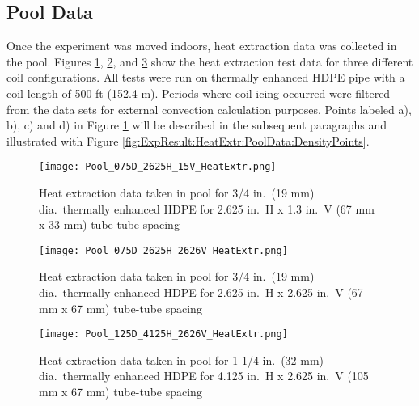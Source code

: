 	\subsection{Pool Data}
	\label{subsec:ExpResult:HeatExtr:PoolData}
	
Once the experiment was moved indoors, heat extraction data was collected in the pool. Figures \ref{fig:ExpResult:HeatExtr:PoolData:Pool_075D_2625H_15V_HeatExtr}, \ref{fig:ExpResult:HeatExtr:PoolData:Pool_075D_2625H_2626V_HeatExtr}, and \ref{fig:ExpResult:HeatExtr:PoolData:Pool_125D_4125H_2626V_HeatExtr} show the heat extraction test data for three different coil configurations. All tests were run on thermally enhanced HDPE pipe with a coil length of 500 ft (152.4 m). Periods where coil icing occurred were filtered from the data sets for external convection calculation purposes. Points labeled a), b), c) and d) in Figure \ref{fig:ExpResult:HeatExtr:PoolData:Pool_075D_2625H_15V_HeatExtr} will be described in the subsequent paragraphs and illustrated with Figure \ref{fig:ExpResult:HeatExtr:PoolData:DensityPoints}.

	\begin{figure}
		\centering
		\texttt{[image: Pool\_075D\_2625H\_15V\_HeatExtr.png]}
		\caption[Heat extraction data taken in pool on June 21, 2012.]{Heat extraction data taken in pool for 3/4 in.\ (19 mm) dia.\ thermally enhanced HDPE for 2.625 in.\ H x 1.3 in.\ V (67 mm x 33 mm) tube-tube spacing}
		\label{fig:ExpResult:HeatExtr:PoolData:Pool_075D_2625H_15V_HeatExtr}
	\end{figure}	
	
		\begin{figure}
		\centering
		\texttt{[image: Pool\_075D\_2625H\_2626V\_HeatExtr.png]}
		\caption[Heat extraction data taken in pool on August 6, 2012.]{Heat extraction data taken in pool for 3/4 in.\ (19 mm) dia.\ thermally enhanced HDPE for 2.625 in.\ H x 2.625 in.\ V (67 mm x 67 mm) tube-tube spacing}
		\label{fig:ExpResult:HeatExtr:PoolData:Pool_075D_2625H_2626V_HeatExtr}
	\end{figure}	
	
		\begin{figure}
		\centering
		\texttt{[image: Pool\_125D\_4125H\_2626V\_HeatExtr.png]}
		\caption[Heat extraction data taken in pool on Oct 22, 2012.]{Heat extraction data taken in pool for 1-1/4 in.\ (32 mm) dia.\ thermally enhanced HDPE for 4.125 in.\ H x 2.625 in.\ V (105 mm x 67 mm) tube-tube spacing}
		\label{fig:ExpResult:HeatExtr:PoolData:Pool_125D_4125H_2626V_HeatExtr}
	\end{figure}	
	
